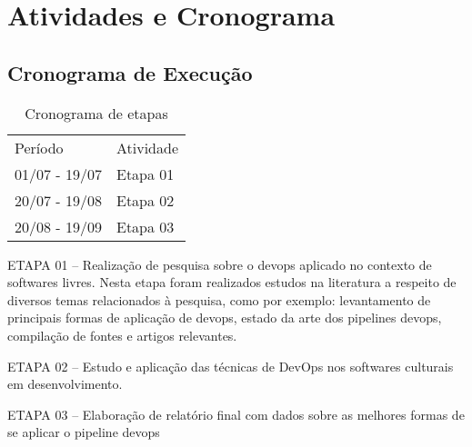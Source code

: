 \chapter[Atividades e Cronograma]{Atividades e Cronograma}

\section{Cronograma de Execução}

\begin{table}[h]
 \centering
 {\renewcommand\arraystretch{1.25}
 \caption{Cronograma de etapas}
 \begin{tabular}{ l l }
  \cline{1-1}\cline{2-2}  
    \multicolumn{1}{|p{3.850cm}|}{Período \centering } &
    \multicolumn{1}{p{4.217cm}|}{Atividade \centering }
  \\  
  \cline{1-1}\cline{2-2}  
    \multicolumn{1}{|p{3.850cm}|}{01/07 - 19/07 \centering } &
    \multicolumn{1}{p{4.217cm}|}{Etapa 01 \centering }
  \\  
  \cline{1-1}\cline{2-2}  
    \multicolumn{1}{|p{3.850cm}|}{20/07 - 19/08 \centering } &
    \multicolumn{1}{p{4.217cm}|}{Etapa 02 \centering }
  \\  
  \cline{1-1}\cline{2-2}  
    \multicolumn{1}{|p{3.850cm}|}{20/08 - 19/09 \centering } &
    \multicolumn{1}{p{4.217cm}|}{Etapa 03 \centering }
  \\  
  \hline

 \end{tabular} }
\end{table}

ETAPA 01 – Realização  de pesquisa sobre o devops aplicado no contexto de softwares livres. Nesta etapa foram realizados estudos na literatura a respeito de diversos temas relacionados à pesquisa, como por exemplo: levantamento de principais formas de aplicação de devops, estado da arte dos pipelines devops, compilação de fontes e artigos relevantes.

ETAPA 02 – Estudo e aplicação das técnicas de DevOps nos softwares culturais em desenvolvimento.

ETAPA 03 – Elaboração de relatório final com dados sobre as melhores formas de se aplicar o pipeline devops
